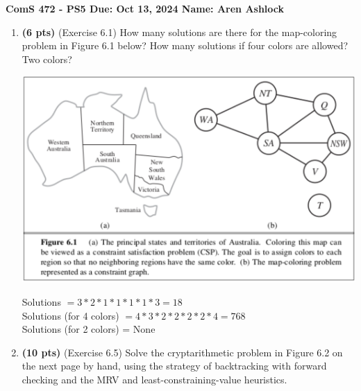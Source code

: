 \documentclass{article}
\begin{document}
\noindent\textbf{ComS 472 - PS5 \quad Due: Oct 13, 2024 \quad Name: Aren Ashlock}

\begin{enumerate}


\item \textbf{(6 pts)} (Exercise 6.1) How many solutions are there for the map-coloring problem in Figure 6.1 below? How many solutions if four colors are allowed? Two colors?

\begin{center}
    \includegraphics[scale=0.5]{472-PS5-Q1.png}
\end{center}

\color{blue}
    Solutions $= 3*2*1*1*1*1*3 = 18$\\
    Solutions (for 4 colors) $= 4*3*2*2*2*2*4 = 768$\\
    Solutions (for 2 colors) = None
\color{black}



\item \textbf{(10 pts)} (Exercise 6.5) Solve the cryptarithmetic problem in Figure 6.2 on the next page by hand, using the strategy of backtracking with forward checking and the MRV and least-constraining-value heuristics.


\end{enumerate}
\end{document}

